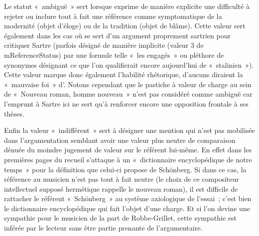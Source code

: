 \documentclass[12pt, a4paper]{article}
\begin{document}
Le statut «~ambiguë~» sert lorsque \robbe{} exprime de manière explicite une difficulté à rejeter ou inclure tout à fait une référence comme symptomatique de la modernité (objet d'éloge) ou de la tradition (objet de blâme). Cette valeur sert également dans les cas où \robbe{} se sert d'un argument proprement sartrien pour critiquer Sartre (parfois désigné de manière implicite (valeur 3 de mReferenceStatus) par une formule telle «~les engagés~» ou pléthore de synonymes désignant ce que l'on qualifierait encore aujourd'hui de «~stalinien~»). Cette valeur marque donc également l'habilité rhétorique, d'aucuns diraient la «~mauvaise foi~» d'\robbe{}. Notons cependant que le pastiche à valeur de charge au sein de «~Nouveau roman, homme nouveau~» n'est pas considéré comme ambiguë car l'emprunt à Sartre ici ne sert qu'à renforcer encore une opposition frontale à ses thèses.

Enfin la valeur «~indifférent~» sert à désigner une mention qui n'est pas mobilisée dans l'argumentation semblant avoir une valeur plus neutre de comparaison dénuée du moindre jugement de valeur sur le référent lui-même. En effet dans les premières pages du recueil \robbe{} s'attaque à un «~dictionnaire encyclopédique de notre temps~» pour la définition que celui-ci propose de Schönberg. Si dans ce cas, la référence au musicien n'est pas tout à fait neutre (le choix de ce compositeur intellectuel supposé hermétique rappelle le nouveau roman), il est difficile de rattacher le référent «~Schönberg~» au système axiologique de l'essai~; c'est bien le dictionnaire encyclopédique qui fait l'objet d'une charge. Et si l'on devine une sympathie pour le musicien de la part de Robbe-Grillet, cette sympathie est inférée par le lecteur sans être partie prenante de l'argumentaire.
   


\end{document}
